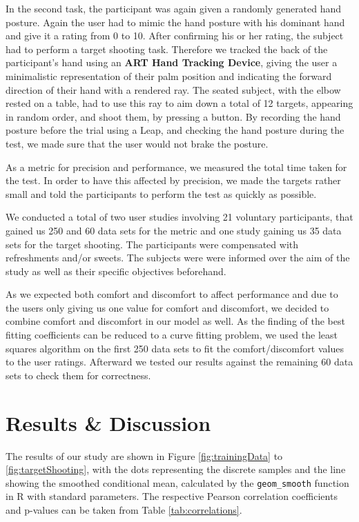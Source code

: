 \documentclass{sig-alternate-05-2015}
\begin{document}
In the second task, the participant was again given a randomly generated hand posture. Again the user had to mimic the hand posture with his dominant hand and give it a rating from 0 to 10. After confirming his or her rating, the subject had to perform a target shooting task. Therefore we tracked the back of the participant's hand using an \textbf{ART Hand Tracking Device}, giving the user a minimalistic representation of their palm position and indicating the forward direction of their hand with a rendered ray. The seated subject, with the elbow rested on a table, had to use this ray to aim down a total of 12 targets, appearing in random order, and shoot them, by pressing a button. By recording the hand posture before the trial using a Leap, and checking the hand posture during the test, we made sure that the user would not brake the posture. 

As a metric for precision and performance, we measured the total time taken for the test. In order to have this affected by precision, we made the targets rather small and told the participants to perform the test as quickly as possible.

We conducted a total of two user studies involving 21 voluntary participants, that gained us 250 and 60 data sets for the metric and one study gaining us 35 data sets for the target shooting. The participants were compensated with refreshments and/or sweets.
The subjects were were informed over the aim of the study as well as their specific objectives beforehand.

As we expected both comfort and discomfort to affect performance and due to the users only giving us one value for comfort and discomfort, we decided to combine comfort and discomfort in our model as well. As the finding of the best fitting coefficients can be reduced to a curve fitting problem, we used the least squares algorithm on the first 250 data sets to fit the comfort/discomfort values to the user ratings. Afterward we tested our results against the remaining 60 data sets to check them for correctness. 

\section{Results \& Discussion}

The results of our study are shown in Figure \ref{fig:trainingData} to \ref{fig:targetShooting}, with the dots representing the discrete samples and the line showing the smoothed conditional mean, calculated by the \texttt{geom\_smooth} function in R with standard parameters. The respective Pearson correlation coefficients and p-values can be taken from Table \ref{tab:correlations}.
\end{document}
